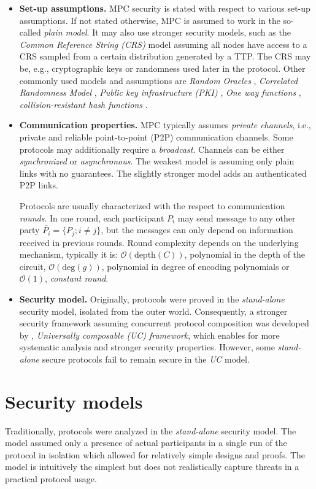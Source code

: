 \documentclass[
  digital, %
  twoside, %
  table,   %
  lof,     %
  lot,     %
]{fithesis3}
\newcommand{\itembf}[1]{\item {\bf{#1}}}
\newcommand{\bigO}[0]{\mathcal{O}}
\newcounter{ph4_show_guides}
\theoremstyle{definition}
\theoremstyle{remark}
\begin{document}
\begin{itemize}
    \itembf{Set-up assumptions.} MPC security is stated with respect to various set-up assumptions. If not stated otherwise, MPC is assumed to work in the so-called \emph{plain model}. It may also use stronger security models, such as the \emph{Common Reference String (CRS)} model \cite{CF01,DN02} assuming all nodes have access to a CRS sampled from a certain distribution generated by a TTP. The CRS may be, e.g., cryptographic keys or randomness used later in the protocol. Other commonly used models and assumptions are \emph{Random Oracles} \cite{HM04}, \emph{Correlated Randomness Model} \cite{FGMR02, FWW04, IKMOP13}, \emph{Public key infrastructure (PKI)} \cite{BCNP04}, \emph{One way functions} \cite{IL89, KL07}, \emph{collision-resistant hash functions} \cite{KL07, GMS08}.
    
    \itembf{Communication properties.} MPC typically assumes \emph{private channels}, i.e., private and reliable point-to-point (P2P) communication channels. Some protocols may additionally require a \emph{broadcast}. Channels can be either \emph{synchronized} or \emph{asynchronous}. The weakest model is assuming only plain links with no guarantees. The slightly stronger model adds an authenticated P2P links.
    
    Protocols are usually characterized with the respect to communication \emph{rounds}. In one round, each participant $P_i$ may send message to any other party $\overline{P_i} = \{P_j; i \neq j\}$, but the messages can only depend on information received in previous rounds. Round complexity depends on the underlying mechanism, typically it is: $\bigO(\text{depth}(C))$, polynomial in the depth of the circuit, $\bigO(\text{deg}(g))$, polynomial in degree of encoding polynomials or $\bigO(1)$, \emph{constant round}.
    
    \itembf{Security model.} Originally, protocols were proved in the \emph{stand-alone} security model, isolated from the outer world. Consequently, a stronger security framework assuming concurrent protocol composition was developed by \cite{Can01}, \emph{Universally composable (UC) framework}, which enables for more systematic analysis and stronger security properties. However, some \emph{stand-alone} secure protocols fail to remain secure in the \emph{UC} model.
    
\end{itemize}

\section{Security models}\label{sec:uc}%
Traditionally, protocols were analyzed in the \emph{stand-alone} security model. The model assumed only a presence of actual participants in a single run of the protocol in isolation which allowed for relatively simple designs and proofs. The model is intuitively the simplest but does not realistically capture threats in a practical protocol usage. 
\end{document}
